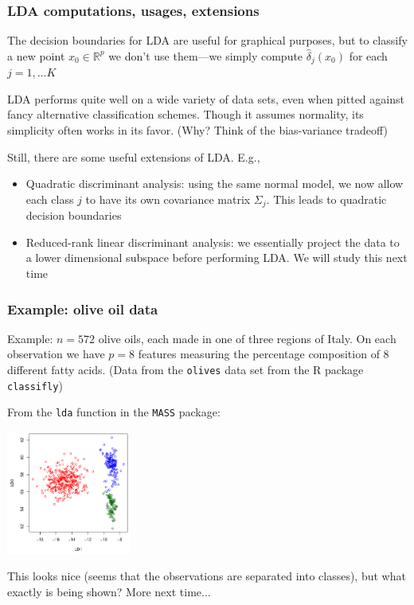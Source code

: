 \documentclass[mathserif]{beamer}
\def\R{\mathds{R}}
\def\red{\color[rgb]{0.8,0,0}}
\begin{document}
\begin{frame}
\frametitle{LDA computations, usages, extensions}
The decision boundaries for LDA are useful for graphical 
purposes, but to classify a new point $x_0 \in \R^p$ we don't
use them---we simply compute $\hat{\delta}_j(x_0)$ for each 
$j=1,\ldots K$

\bigskip
LDA performs quite well on a wide variety of data sets, even when
pitted against fancy alternative classification schemes. Though
it assumes normality, its simplicity often works in its favor.
(Why? Think of the {\red bias-variance tradeoff})

\bigskip
Still, there are some useful extensions of LDA. E.g.,
\begin{itemize}
\item {\red Quadratic discriminant analysis}: using the same normal model,
we now allow each class $j$ to have its own covariance matrix $\Sigma_j$.
This leads to quadratic decision boundaries
\item {\red Reduced-rank linear discriminant analysis}: we essentially 
project the data to a lower dimensional subspace before performing LDA.
We will study this next time
\end{itemize}
\end{frame}

\begin{frame}
\frametitle{Example: olive oil data}
\smallskip
Example: $n=572$ olive oils, each made in one of three regions
of Italy. On each observation we have $p=8$ features measuring
the percentage composition of 8 different fatty acids. (Data 
from the {\tt olives} data set from the R package {\tt classifly})

\bigskip
From the {\tt lda} function in the {\tt MASS} package:
\begin{center}
\includegraphics[width=1.6in]{lda.pdf}
\end{center}
\vspace{-8pt}
This looks nice (seems that the observations are separated into
classes), but what exactly is being shown? More next time...
\end{frame}
\end{document}
